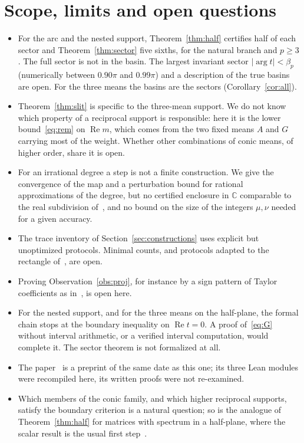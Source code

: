 \documentclass[10pt,a4paper]{article}
\theoremstyle{plain}
\theoremstyle{remark}
\numberwithin{equation}{section}
\newcommand{\C}{\mathbb{C}}\newcommand{\R}{\mathbb{R}}\newcommand{\Hp}{\mathbb{H}}
\DeclareMathOperator{\re}{Re}\DeclareMathOperator{\im}{Im}
\begin{document}
\section{Scope, limits and open questions}\label{sec:limits}

\begin{itemize}
\item For the arc and the nested support, Theorem~\ref{thm:half} certifies half of each sector and
  Theorem~\ref{thm:sector} five sixths, for the natural branch and $p\ge3$. The full sector is not
  in the basin. The largest invariant sector $|\arg t|<\beta_p$ (numerically between $0.90\pi$ and
  $0.99\pi$) and a description of the true basins are open. For the three means the basins are the
  sectors (Corollary~\ref{cor:all}).
\item Theorem~\ref{thm:slit} is specific to the three-mean support. We do not know which property
  of a reciprocal support is responsible: here it is the lower bound~\eqref{eq:rem} on $\re m$,
  which comes from the two fixed means $A$ and $G$ carrying most of the weight. Whether other
  combinations of conic means, of higher order, share it is open.
\item For an irrational degree a step is not a finite construction. We give the convergence of the
  map and a perturbation bound for rational approximations of the degree, but no certified
  enclosure in $\C$ comparable to the real subdivision of~\cite{v28}, and no bound on the size of
  the integers $\mu,\nu$ needed for a given accuracy.
\item The trace inventory of Section~\ref{sec:constructions} uses explicit but unoptimized
  protocols. Minimal counts, and protocols adapted to the rectangle of~\cite{v28}, are open.
\item Proving Observation~\ref{obs:proj}, for instance by a sign pattern of Taylor coefficients as
  in~\cite{guo10}, is open here.
\item For the nested support, and for the three means on the half-plane, the formal chain stops at
  the boundary inequality on $\re t=0$. A proof of~\eqref{eq:G} without interval arithmetic, or a
  verified interval computation, would complete it. The sector theorem is not formalized at all.
\item The paper~\cite{v29} is a preprint of the same date as this one; its three Lean modules were
  recompiled here, its written proofs were not re-examined.
\item Which members of the conic family, and which higher reciprocal supports, satisfy the boundary
  criterion is a natural question; so is the analogue of Theorem~\ref{thm:half} for matrices with
  spectrum in a half-plane, where the scalar result is the usual first step~\cite{iannazzo08}.
\end{itemize}
\end{document}
